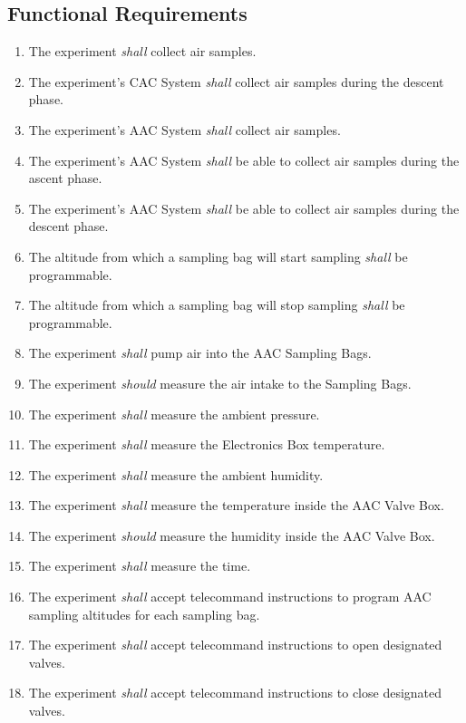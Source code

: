 \subsection{Functional Requirements}

\begin{enumerate}[label=F.\arabic*]
    \item The experiment \textit{shall} collect air samples.
    \item The experiment's CAC System \textit{shall} collect air samples during the descent phase.
    \item The experiment's AAC System \textit{shall} collect air samples.
    \item The experiment's AAC System \textit{shall} be able to collect air samples during the ascent phase.
    \item The experiment's AAC System \textit{shall} be able to collect air samples during the descent phase.
    \item The altitude from which a sampling bag will start sampling \textit{shall} be programmable.
    \item The altitude from which a sampling bag will stop sampling \textit{shall} be programmable.
    \item The experiment \textit{shall} pump air into the AAC Sampling Bags.
    \item The experiment \textit{should} measure the air intake to the Sampling Bags.
    \item The experiment \textit{shall} measure the ambient pressure.
    \item The experiment \textit{shall} measure the Electronics Box temperature.
    \item The experiment \textit{shall} measure the ambient humidity.
    \item The experiment \textit{shall} measure the temperature inside the AAC Valve Box.
    \item The experiment \textit{should} measure the humidity inside the AAC Valve Box.
    \item The experiment \textit{shall} measure the time.
    \item The experiment \textit{shall} accept telecommand instructions to program AAC sampling altitudes for each sampling bag.
    \item The experiment \textit{shall} accept telecommand instructions to open designated valves.
    \item The experiment \textit{shall} accept telecommand instructions to close designated valves.

\end{enumerate}
